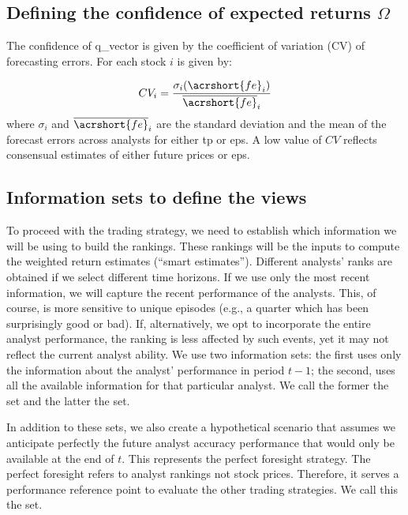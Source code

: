 \documentclass[a4paper,twoside,12pt,openright,notitlepage]{report}\usepackage[]{graphicx}\usepackage[]{color}
\begin{document}
\subsection{Defining the confidence of expected returns $\Omega$}
\label{def-omega}
The confidence of \gls{q_vector} is given by the coefficient of variation (CV) of forecasting errors. For each stock $i$ is given by:

\begin{equation}
\label{eq-cv}
CV_{i} = \frac{\sigma_i (\acrshort{fe}_{i})}{\overline{\acrshort{fe}}_{i}}
\end{equation}
where $\sigma_i$ and $\overline{\acrshort{fe}}_i$ are the standard deviation and the mean of the forecast errors across analysts for either \gls{tp} or \gls{eps}. A low value of $CV$ reflects consensual estimates of either future prices or \gls{eps}.



\subsection{Information sets to define the views}
\label{inf-set}
To proceed with the trading strategy, we need to establish which information we  will be using to build the rankings. These rankings will be the inputs to compute the weighted return estimates (``smart estimates''). Different analysts' ranks are obtained  if we select different time horizons. If we use only the most  recent information, we will capture the recent performance of the analysts. This, of course, is more sensitive to unique episodes (e.g., a quarter which has been surprisingly good or bad). If, alternatively, we opt to incorporate the entire analyst performance, the ranking is less affected by such events, yet it may not reflect the current analyst ability. We use two information sets: the first uses only the  information about the analyst' performance in period $t-1$; the second, uses all the available  information for that particular analyst. We call the former the \naive{} set and the latter the  set.

In addition to these sets,  we also create a hypothetical scenario that assumes we anticipate perfectly the future analyst accuracy performance  that would only be available at the end of $t$.  This represents the perfect foresight strategy. The perfect foresight refers to analyst rankings not stock prices. Therefore, it serves a performance reference point to evaluate the other trading strategies. We call this the \tr{} set.
\end{document}
